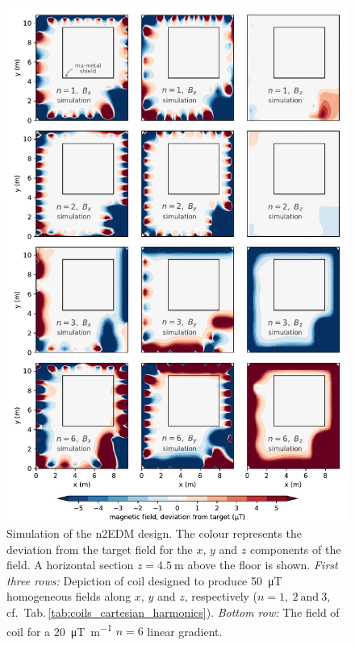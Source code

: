 \begin{figure}
  \centering
  \includegraphics[width=\linewidth]{gfx/prototype/n2EDM_simulation2.pdf}
  \caption{Simulation of the n2EDM design.
  The colour represents the deviation from the target field for the $x$, $y$ and $z$ components of the field.
  A horizontal section $z=\SI{4.5}{\meter}$ above the floor is shown.
  \emph{First three rows:} Depiction of coil designed to produce \SI{50}{\micro\tesla} homogeneous fields along $x$, $y$ and $z$, respectively ($n = 1,\ 2\ \text{and}\ 3$, cf.\ Tab.\,\ref{tab:coils_cartesian_harmonics}).
  \emph{Bottom row:} The field of coil for a \SI[per-mode=symbol]{20}{\micro\tesla\per\meter} $n=6$ linear gradient.}\label{fig:n2EDM_design_fields}
\end{figure}

